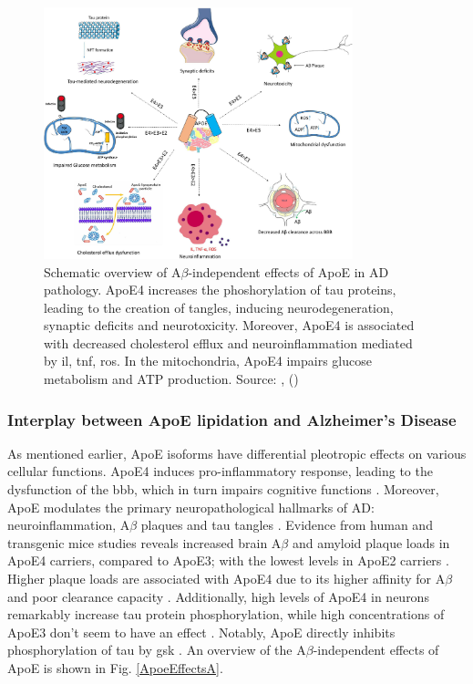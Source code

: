 \documentclass{amsart}
\begin{document}
\begin{figure}[b]
  \includegraphics[width=0.8\textwidth]{figures/ApoEeffectsA.jpg}
    \caption{Schematic overview of A$\beta$-independent effects of ApoE in AD pathology. ApoE4 increases the phoshorylation of tau proteins, leading to the creation of tangles, inducing neurodegeneration, synaptic deficits and neurotoxicity. Moreover, ApoE4 is associated with decreased cholesterol efflux and neuroinflammation mediated by \acrfull{il}, \acrfull{tnf}, \acrfull{ros}. In the mitochondria, ApoE4 impairs glucose metabolism and ATP production.  Source: ,  (\citeyear{Husain2021APOETherapeutics}) \cite{Husain2021APOETherapeutics}}
  \label{ApoeEffectsB}
\end{figure}

\subsubsection{Interplay between ApoE lipidation and Alzheimer's Disease}\label{ApoEAD}
As mentioned earlier, ApoE isoforms have differential pleotropic effects on various cellular functions. ApoE4 induces pro-inflammatory response, leading to the dysfunction of the \acrlong{bbb}, which in turn impairs cognitive functions \cite{Marottoli2017PeripheralDysfunction, Teng2017ApoEInjury, Kloske2020TheDisease}. Moreover, ApoE modulates the primary neuropathological hallmarks of AD: neuroinflammation, A$\beta$ plaques and tau tangles \cite{Husain2021APOETherapeutics}. Evidence from human and transgenic mice studies reveals increased brain A$\beta$ and amyloid plaque loads in ApoE4 carriers, compared to ApoE3; with the lowest levels in ApoE2 carriers \cite{Huang2017ApoE2Secretion, Tachibana2016RescuingLRP1, Safieh2019ApoE4:Disease}. Higher plaque loads are associated with ApoE4 due to its higher affinity for A$\beta$ and poor clearance capacity \cite{Kloske2020TheDisease}. Additionally, high levels of ApoE4 in neurons remarkably increase tau protein phosphorylation, while high concentrations of ApoE3 don't seem to have an effect \cite{Cao2017ApoE4-associatedInjury, Shi2017ApoE4Tauopathy, Vasilevskaya2020InteractionAthletes, Wang2018GainCorrector}. Notably,  ApoE directly inhibits phosphorylation of tau by \acrshort{gsk} \cite{Hoe2006ApolipoproteinNeurons}. An overview of the A$\beta$-independent effects of ApoE is shown in Fig. \ref{ApoeEffectsA}.
\end{document}
